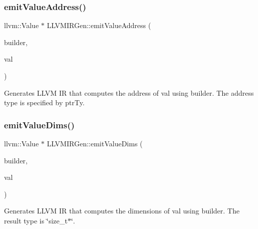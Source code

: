 \subsubsection{\texorpdfstring{emit\+Value\+Address()}{emitValueAddress()}}
{\footnotesize\ttfamily llvm\+::\+Value $\ast$ L\+L\+V\+M\+I\+R\+Gen\+::emit\+Value\+Address (\begin{DoxyParamCaption}\item[{llvm\+::\+I\+R\+Builder$<$$>$ \&}]{builder,  }\item[{const \hyperlink{classglow_1_1_value}{glow\+::\+Value} $\ast$}]{val }\end{DoxyParamCaption})\hspace{0.3cm}{\ttfamily [protected]}}

Generates L\+L\+VM IR that computes the address of {\ttfamily val} using {\ttfamily builder}. The address type is specified by {\ttfamily ptr\+Ty}. \mbox{\label{classglow_1_1_l_l_v_m_i_r_gen_a48f4e8b52d60ed9688c2fbfbd233ee93}} 
\subsubsection{\texorpdfstring{emit\+Value\+Dims()}{emitValueDims()}}
{\footnotesize\ttfamily llvm\+::\+Value $\ast$ L\+L\+V\+M\+I\+R\+Gen\+::emit\+Value\+Dims (\begin{DoxyParamCaption}\item[{llvm\+::\+I\+R\+Builder$<$$>$ \&}]{builder,  }\item[{const \hyperlink{classglow_1_1_value}{glow\+::\+Value} $\ast$}]{val }\end{DoxyParamCaption})\hspace{0.3cm}{\ttfamily [protected]}}

Generates L\+L\+VM IR that computes the dimensions of {\ttfamily val} using {\ttfamily builder}. The result type is \char`\"{}size\+\_\+t$\ast$\char`\"{}. \mbox{\label{classglow_1_1_l_l_v_m_i_r_gen_a267fccf16ace7e109c96839e27112db1}} 
